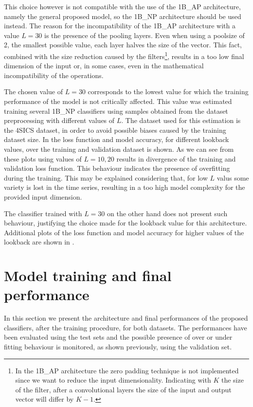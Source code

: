 This choice however is not compatible with the use of the 1B\_AP architecture, namely the general proposed model, so the 1B\_NP architecture should be used instead. The reason for the incompatibility of the 1B\_AP architecture with a value $L=30$ is the presence of the pooling layers. 
Even when using a poolsize of 2, the smallest possible value, each layer halves the size of the vector. This fact, combined with the size reduction caused by the filters\footnote{In the 1B\_AP architecture the zero padding technique is not implemented since we want to reduce the input dimensionality. Indicating with $K$ the size of the filter, after a convolutional layers the size of the input and output vector will differ by $K-1$.}, results in a too low final dimension of the input or, in some cases, even in the mathematical incompatibility of the operations.

The chosen value of $L=30$ corresponds to the lowest value for which the training performance of the model is not critically affected. This value was estimated training several 1B\_NP classifiers using samples obtained from the dataset preprocessing with different values of $L$. The dataset used for this estimation is the 4SICS dataset, in order to avoid possible biases caused by the training dataset size. 
In  the loss function and model accuracy, for different lookback values, over the training and validation dataset is shown. As we can see from these plots  using values of $L=10,20$ results in divergence of the training and validation loss function. This behaviour indicates the presence of overfitting during the training. This may be explained considering that, for low $L$ valus some variety is lost in the time series, resulting in a too high model complexity for the provided input dimension.

The classifier trained with $L=30$ on the other hand does not present such behaviour, justifying the choice made for the lookback value for this architecture. Additional plots of the loss function and model accuracy for higher values of the lookback are shown in .





\section{Model training and final performance}\label{res_test}

In this section we present the architecture and final performances of the proposed classifiers, after the training procedure, for both datasets. The performances have been evaluated using the test sets and the possible presence of over or under fitting behaviour is monitored, as shown previously, using the validation set. 

